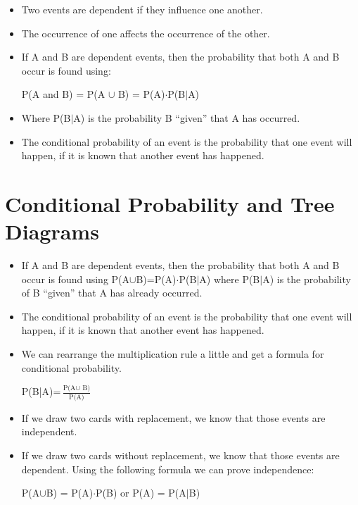 \documentclass[../stats.tex]{subfiles}
\begin{document}
\begin{itemize}
    \item Two events are dependent if they influence one another.
    \item The occurrence of one affects the occurrence of the other.
    \item If A and B are dependent events, then the probability that both A and B occur is found using:
    \begin{center}
        P(A and B) = P(A $\cup$ B) = P(A)$\cdot$P(B$|$A)
    \end{center}
    \item Where P(B$|$A) is the probability B ``given'' that A has occurred.
    \item The conditional probability of an event is the probability that one event will happen, if it is known that another event has happened.
\end{itemize}

\section{Conditional Probability and Tree Diagrams}
\begin{itemize}
    \item If A and B are dependent events, then the probability that both A and B occur is found using 
    P(A$\cup$B)=P(A)$\cdot$P(B$|$A) where P(B$|$A) is the probability of B ``given'' that A has already occurred.
    \item The conditional probability of an event is the probability that one event will happen, if it is known that another event has happened.
    \item We can rearrange the multiplication rule a little and get a formula for conditional probability.
    \begin{center}
        P(B|A)=$\frac{\text{P(A$\cup$ B)}}{\text{P(A)}}$
    \end{center}
\end{itemize}
\begin{itemize}
    \item If we draw two cards with replacement, we know that those events are independent.
    \item If we draw two cards without replacement, we know that those events are dependent.
    Using the following formula we can prove independence:
    \begin{center}
        P(A$\cup$B) = P(A)$\cdot$P(B) or P(A) = P(A$|$B)
    \end{center}
\end{itemize}
\end{document}
